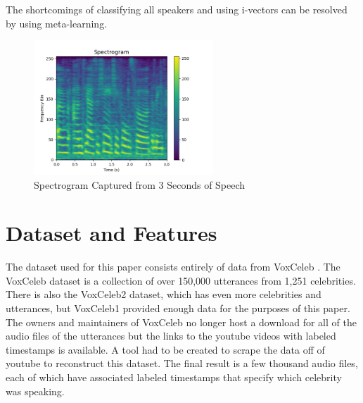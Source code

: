 \documentclass{article}
\begin{document}
The shortcomings of classifying all speakers and using i-vectors can be resolved by using meta-learning. 


\begin{figure}
  \centering
  \includegraphics[width=0.6\textwidth]{Images/spectrogram_example.png}
  \caption{Spectrogram Captured from 3 Seconds of Speech}
  \label{fig:SpectrogramExample}
\end{figure}

\section{Dataset and Features}
The dataset used for this paper consists entirely of data from VoxCeleb \cite{DBLP:journals/corr/NagraniCZ17}. The 
VoxCeleb dataset is a collection of over 150,000 utterances from 1,251 celebrities. There is also the VoxCeleb2 \cite{Chung18b} 
dataset, which has even more celebrities and utterances, but VoxCeleb1 provided enough data for the purposes of this paper.
The owners and maintainers of VoxCeleb no longer host a download for all of the audio files of the utterances but the 
links to the youtube videos with labeled timestamps is available. A tool had to be created to scrape the data off of
youtube to reconstruct this dataset. The final result is a few thousand audio files, each of which have associated labeled
timestamps that specify which celebrity was speaking.
\end{document}

